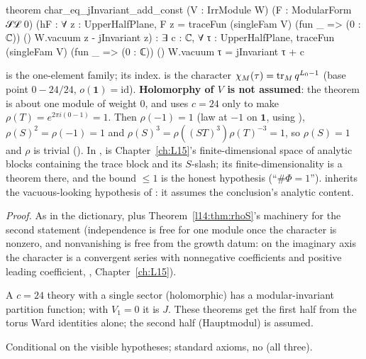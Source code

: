 \begin{leancode}
theorem char_eq_jInvariant_add_const (V : IrrModule W) (F : ModularForm 𝒮ℒ 0)
    (hF : ∀ z : UpperHalfPlane,
      F z = traceFun (singleFam V) (fun _ => (0 : ℂ)) () W.vacuum z - jInvariant z) :
    ∃ c : ℂ, ∀ τ : UpperHalfPlane,
      traceFun (singleFam V) (fun _ => (0 : ℂ)) () W.vacuum τ = jInvariant τ + c
\end{leancode}
\begin{dictionary}
 is the one-element family; \lean{()} its index.  is the
character $\chi_M(\tau) = \operatorname{tr}_Mq^{L_0-1}$ (base point $0 - 24/24$, $o(\mathbf 1) = \mathrm{id}$). \textbf{Holomorphy of $V$ is not
assumed}: the theorem is about one module of weight $0$, and uses $c = 24$ only to make $\rho(T) = e^{2\pi i(0-1)} = 1$. Then
$\rho(-1) = 1$ (law at $-1$ on $\mathbf 1$, using ), $\rho(S)^2 = \rho(-1) = 1$ and $\rho(S)^3 = \rho((ST)^3)\rho(T)^{-3} =
1$, so $\rho(S) = 1$ and $\rho$ is trivial (). In
,  is Chapter~\ref{ch:L15}'s finite-dimensional space of
analytic blocks containing the trace block and its $S$-slash; its finite-dimensionality is a theorem there, and the bound
$\le1$ is the honest hypothesis (``$\#\Phi = 1$'').  inherits the vacuous-looking hypothesis
of : it assumes the conclusion's analytic content.
\end{dictionary}
\noindent\emph{Proof.} As in the dictionary, plus Theorem~\ref{l14:thm:rhoS}'s machinery for the second statement (independence
is free for one module once the character is nonzero, and nonvanishing is free from the growth datum: on the imaginary axis the character is a convergent series with
nonnegative coefficients and positive leading coefficient, , Chapter~\ref{ch:L15}).
\begin{physics}
A $c=24$ theory with a single sector (holomorphic) has a modular-invariant partition function; with $V_1 = 0$ it is $J$. These
theorems get the first half from the torus Ward identities alone; the second half (Hauptmodul) is assumed.
\end{physics}
\begin{status}
Conditional on the visible hypotheses; standard axioms, no  (all three).
\end{status}
